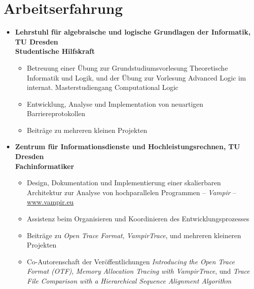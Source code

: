 \section*{Arbeitserfahrung}
\begin{itemize}
	\item {}
		\textbf{Lehrstuhl f\"ur algebraische und logische Grundlagen der Informatik, TU Dresden} \\
		\textbf{Studentische Hilfskraft}
		\begin{itemize}
			\item Betreuung einer \"Ubung zur Grundstudiumsvorlesung Theoretische Informatik und Logik, und der \"Ubung zur Vorlesung Advanced Logic im internat. Masterstudiengang Computational Logic
			\item Entwicklung, Analyse und Implementation von neuartigen Barriereprotokollen
			\item Beitr\"age zu mehreren kleinen Projekten
		\end{itemize}
	\item {}
		\textbf{Zentrum f\"ur Informationsdienste und Hochleistungsrechnen, TU Dresden} \\
		\textbf{Fachinformatiker}
		\begin{itemize}
			\item Design, Dokumentation und Implementierung einer skalierbaren Architektur zur Analyse von hochparallelen Programmen -- \emph{Vampir} -- \href{http://www.vampir.eu}{www.vampir.eu}
			\item Assistenz beim Organisieren und Koordinieren des Entwicklungsprozesses
			\item Beitr\"age zu \emph{Open Trace Format}, \emph{VampirTrace}, und mehreren kleineren Projekten
			\item Co-Autorenschaft der Ver\"offentlichungen \emph{Introducing the Open Trace Format (OTF)}, 
			\emph{Memory Allocation Tracing with VampirTrace}, und \emph{Trace File Comparison with a Hierarchical Sequence Alignment Algorithm}
		\end{itemize}
\end{itemize}

\customhrule

